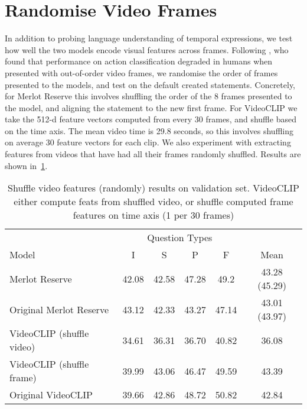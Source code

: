 \section{Randomise Video Frames}

In addition to probing language understanding of temporal expressions, we test
how well the two models encode visual features across frames. Following
\citet{sevilla-lara2021temporal}, who found that performance on action
classification degraded in humans when presented with out-of-order video
frames, we randomise the order of frames %
presented to the models, and test on the default created statements.
Concretely, for Merlot Reserve this involves shuffling the order of the 8
frames presented to the model, and aligning the statement to the new first
frame. For VideoCLIP we take the 512-d feature vectors computed from every 30
frames, and shuffle based on the time axis. The mean video time is 29.8
seconds, so this involves shuffling on average 30 feature vectors for each
clip. We also experiment with extracting features from videos that have had all
their frames randomly shuffled. Results are shown in~\cref{tab:shuffle_feats}.

\begin{table}[tp]
    \centering
    \caption{Shuffle video features (randomly) results on validation set. %
		VideoCLIP either compute feats from shuffled video,
		or shuffle computed frame features on time axis (1 per 30 frames)}
    \label{tab:shuffle_feats}
    \begin{tabular}{lccccc}
        \toprule
        \multicolumn{1}{c}{}      & \multicolumn{4}{c}{Question Types}  & \multicolumn{1}{c}{} \\
        \cmidrule(){2-5}
        Model                     & I & S & P & F & Mean \\
        \cmidrule(r){1-1} \cmidrule(){2-5} \cmidrule(l){6-6}
        Merlot Reserve            & 42.08       & 42.58    & 47.28      & 49.2        & 43.28 (45.29) \\
        Original Merlot Reserve   & 43.12       & 42.33    & 43.27      & 47.14       & 43.01 (43.97) \\
        \cmidrule(r){1-1} \cmidrule(){2-5} \cmidrule(l){6-6}
        VideoCLIP (shuffle video) & 34.61       & 36.31    & 36.70      & 40.82       & 36.08 \\
        VideoCLIP (shuffle frame) & 39.99       & 43.06    & 46.47      & 49.59       & 43.39 \\
        Original VideoCLIP        & 39.66       & 42.86    & 48.72      & 50.82       & 42.84 \\
        \bottomrule
    \end{tabular}
\end{table}

